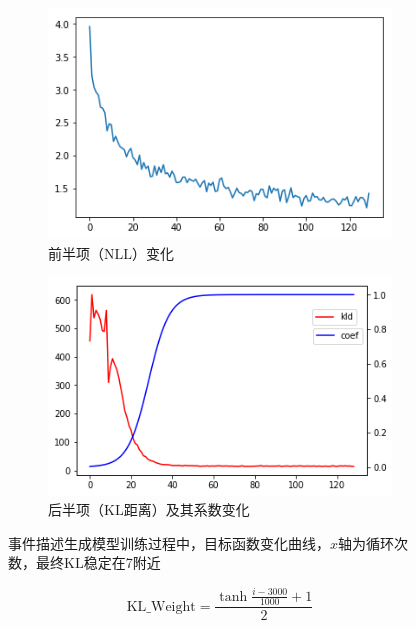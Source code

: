\begin{figure}[htb]
    \centering
	\begin{subfigure}{.4\textwidth}
		\includegraphics[width=\textwidth]{ce.png}
		\caption{前半项（$\mathrm{NLL}$）变化}
	\end{subfigure}
	\begin{subfigure}{.425\textwidth}
		\includegraphics[width=\textwidth]{ceof.png}
		\caption{后半项（$\mathrm{KL}$距离）及其系数变化}
    \end{subfigure}
    \caption{事件描述生成模型训练过程中，目标函数变化曲线，$x$轴为循环次数，最终$\mathrm{KL}$稳定在7附近}
    \label{f3-2}
\end{figure}

\begin{equation}\label{3-8}
    \mathrm{KL\_Weight}=\frac{\tanh\frac{i-3000}{1000}+1}{2}
\end{equation}

